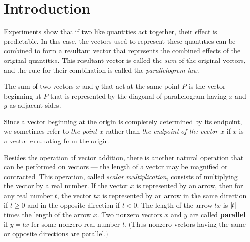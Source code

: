\section{Introduction}\label{sec:1.1}

\begin{note}
    Experiments show that if two like quantities act together, their effect is predictable.
    In this case, the vectors used to represent these quantities can be combined to form a resultant vector that represents the combined effects of the original quantities.
    This resultant vector is called the \emph{sum} of the original vectors, and the rule for their combination is called the \emph{parallelogram law}.
\end{note}

\begin{ax}\label{1.1.1}
    The sum of two vectors \(x\) and \(y\) that act at the same point \(P\) is the vector beginning at \(P\) that is represented by the diagonal of parallelogram having \(x\) and \(y\) as adjacent sides.
\end{ax}

\begin{note}
    Since a vector beginning at the origin is completely determined by its endpoint, we sometimes refer to \emph{the point \(x\)} rather than \emph{the endpoint of the vector \(x\)} if \(x\) is a vector emanating from the origin.
\end{note}

\begin{note}
    Besides the operation of vector addition, there is another natural operation that can be performed on vectors
    --- the length of a vector may be magnified or contracted.
    This operation, called \emph{scalar multiplication}, consists of multiplying the vector by a real number.
    If the vector \(x\) is represented by an arrow, then for any real number \(t\), the vector \(tx\) is represented by an arrow in the same direction if \(t \geq 0\) and in the opposite direction if \(t < 0\).
    The length of the arrow \(tx\) is \(\left\lvert t\right\rvert\) times the length of the arrow \(x\).
    Two nonzero vectors \(x\) and \(y\) are called \textbf{parallel} if \(y = tx\) for some nonzero real number \(t\).
    (Thus nonzero vectors having the same or opposite directions are parallel.)
\end{note}
